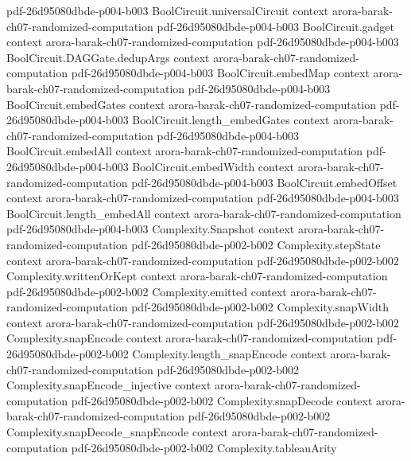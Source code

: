 \begin{theorem}
  {pdf-26d95080dbde-p004-b003}
\proofstep
  {BoolCircuit.universalCircuit}
  {context}
  {arora-barak-ch07-randomized-computation}
  {pdf-26d95080dbde-p004-b003}
\proofstep
  {BoolCircuit.gadget}
  {context}
  {arora-barak-ch07-randomized-computation}
  {pdf-26d95080dbde-p004-b003}
\proofstep
  {BoolCircuit.DAGGate.dedupArgs}
  {context}
  {arora-barak-ch07-randomized-computation}
  {pdf-26d95080dbde-p004-b003}
\proofstep
  {BoolCircuit.embedMap}
  {context}
  {arora-barak-ch07-randomized-computation}
  {pdf-26d95080dbde-p004-b003}
\proofstep
  {BoolCircuit.embedGates}
  {context}
  {arora-barak-ch07-randomized-computation}
  {pdf-26d95080dbde-p004-b003}
\proofstep
  {BoolCircuit.length_embedGates}
  {context}
  {arora-barak-ch07-randomized-computation}
  {pdf-26d95080dbde-p004-b003}
\proofstep
  {BoolCircuit.embedAll}
  {context}
  {arora-barak-ch07-randomized-computation}
  {pdf-26d95080dbde-p004-b003}
\proofstep
  {BoolCircuit.embedWidth}
  {context}
  {arora-barak-ch07-randomized-computation}
  {pdf-26d95080dbde-p004-b003}
\proofstep
  {BoolCircuit.embedOffset}
  {context}
  {arora-barak-ch07-randomized-computation}
  {pdf-26d95080dbde-p004-b003}
\proofstep
  {BoolCircuit.length_embedAll}
  {context}
  {arora-barak-ch07-randomized-computation}
  {pdf-26d95080dbde-p004-b003}
\proofstep
  {Complexity.Snapshot}
  {context}
  {arora-barak-ch07-randomized-computation}
  {pdf-26d95080dbde-p002-b002}
\proofstep
  {Complexity.stepState}
  {context}
  {arora-barak-ch07-randomized-computation}
  {pdf-26d95080dbde-p002-b002}
\proofstep
  {Complexity.writtenOrKept}
  {context}
  {arora-barak-ch07-randomized-computation}
  {pdf-26d95080dbde-p002-b002}
\proofstep
  {Complexity.emitted}
  {context}
  {arora-barak-ch07-randomized-computation}
  {pdf-26d95080dbde-p002-b002}
\proofstep
  {Complexity.snapWidth}
  {context}
  {arora-barak-ch07-randomized-computation}
  {pdf-26d95080dbde-p002-b002}
\proofstep
  {Complexity.snapEncode}
  {context}
  {arora-barak-ch07-randomized-computation}
  {pdf-26d95080dbde-p002-b002}
\proofstep
  {Complexity.length_snapEncode}
  {context}
  {arora-barak-ch07-randomized-computation}
  {pdf-26d95080dbde-p002-b002}
\proofstep
  {Complexity.snapEncode_injective}
  {context}
  {arora-barak-ch07-randomized-computation}
  {pdf-26d95080dbde-p002-b002}
\proofstep
  {Complexity.snapDecode}
  {context}
  {arora-barak-ch07-randomized-computation}
  {pdf-26d95080dbde-p002-b002}
\proofstep
  {Complexity.snapDecode_snapEncode}
  {context}
  {arora-barak-ch07-randomized-computation}
  {pdf-26d95080dbde-p002-b002}
\proofstep
  {Complexity.tableauArity}

\end{theorem}
